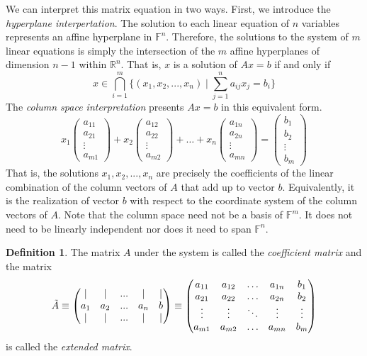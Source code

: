 \documentclass{article}
\theoremstyle{remark}
\theoremstyle{definition}
\newtheorem{definition}{Definition}[section]
\begin{document}
We can interpret this matrix equation in two ways. First, we introduce the \textit{hyperplane interpertation}. The solution to each linear equation of $n$ variables represents an affine hyperplane in $\mathbb{F}^n$. Therefore, the solutions to the system of $m$ linear equations is simply the intersection of the $m$ affine hyperplanes of dimension $n-1$ within $\mathbb{R}^n$. That is, $x$ is a solution of $A x = b$ if and only if  
\[ x \in \bigcap_{i = 1}^m \Big\{ (x_1, x_2, ..., x_n) \; | \; \sum_{j = 1}^n a_{i j} x_j = b_i \Big\} \]
The \textit{column space interpretation} presents $A x = b$ in this equivalent form. 
\[ x_1 \begin{pmatrix}
a_{1 1} \\ a_{2 1} \\ \vdots \\ a_{m 1}
\end{pmatrix} + x_2 \begin{pmatrix}
a_{1 2} \\ a_{2 2} \\ \vdots \\ a_{m 2}
\end{pmatrix} + \ldots + x_n \begin{pmatrix}
a_{1 n} \\ a_{2 n} \\ \vdots \\ a_{m n}
\end{pmatrix} = \begin{pmatrix}
b_1 \\ b_2 \\ \vdots \\ b_m
\end{pmatrix}\]
That is, the solutions $x_1, x_2, ..., x_n$ are precisely the coefficients of the linear combination of the column vectors of $A$ that add up to vector $b$. Equivalently, it is the realization of vector $b$ with respect to the coordinate system of the column vectors of $A$. Note that the column space need not be a basis of $\mathbb{F}^m$. It does not need to be linearly independent nor does it need to span $\mathbb{F}^n$. 

\begin{definition}
The matrix $A$ under the system is called the \textit{coefficient matrix} and the matrix 
\[\Tilde{A} \equiv \begin{pmatrix}
| & | & ... & | & | \\
a_1 & a_2 & ... & a_n & b \\
| & | & ... & | & | 
\end{pmatrix} \equiv \begin{pmatrix}
a_{1 1} & a_{1 2} & \ldots& a_{1 n} & b_1\\
 a_{2 1} & a_{2 2} & \ldots & a_{2 n} & b_2\\
\vdots & \vdots & \ddots & \vdots & \vdots\\
 a_{m 1} & a_{m 2} & \ldots & a_{m n} & b_m
\end{pmatrix}\]
is called the \textit{extended matrix}. 
\end{definition}
\end{document}
